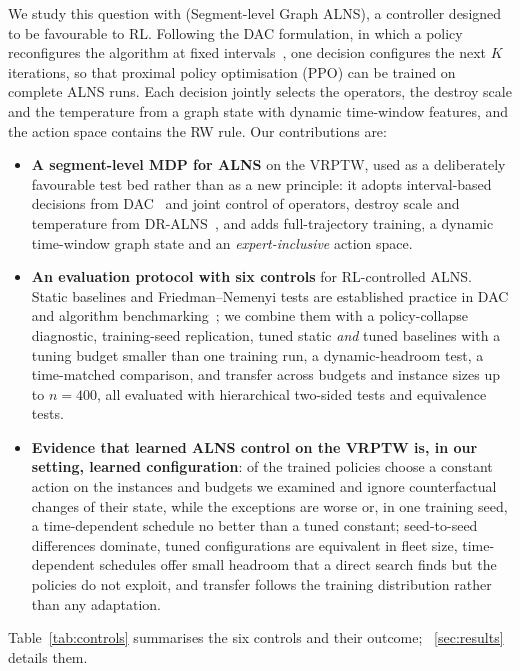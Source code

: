 We study this question with \sgalns{} (Segment-level Graph ALNS), a controller designed
to be favourable to RL. Following the DAC formulation, in which a policy
reconfigures the algorithm at fixed intervals~\cite{biedenkapp2020dac}, one decision
configures the next $K$ iterations, so that proximal policy optimisation (PPO) can be
trained on complete ALNS runs. Each decision jointly selects the operators, the destroy
scale and the temperature from a graph state with dynamic time-window features, and the
action space contains the RW rule. Our contributions are:
\begin{itemize}
\item \textbf{A segment-level MDP for ALNS} on the VRPTW, used as a deliberately
favourable test bed rather than as a new principle: it adopts interval-based decisions
from DAC~\cite{biedenkapp2020dac} and joint control of operators, destroy scale and
temperature from DR-ALNS~\cite{reijnen2024}, and adds full-trajectory training, a
dynamic time-window graph state and an \emph{expert-inclusive} action space.
\item \textbf{An evaluation protocol with six controls} for RL-controlled ALNS. Static
baselines and Friedman--Nemenyi tests are established practice in DAC and algorithm
benchmarking~\cite{eimer2021dacbench,demsar2006}; we combine them with a policy-collapse
diagnostic, training-seed replication, tuned static \emph{and} tuned \Rw{} baselines
with a tuning budget smaller than one training run, a dynamic-headroom test, a
time-matched comparison, and transfer across budgets and instance sizes up to $n=400$,
all evaluated with hierarchical two-sided tests and equivalence tests.
\item \textbf{Evidence that learned ALNS control on the VRPTW is, in our setting,
learned configuration}: \tCollapsed{} of the \tNpol{} trained policies choose a
constant action on the instances and budgets we examined and ignore counterfactual
changes of their state, while the exceptions are worse or, in one training seed, a
time-dependent schedule no better than a tuned constant; seed-to-seed differences dominate, tuned
configurations are equivalent in fleet size, time-dependent schedules offer small
headroom that a direct search finds but the policies do not exploit, and transfer
follows the training distribution rather than any adaptation.
\end{itemize}
Table~\ref{tab:controls} summarises the six controls and their outcome; \Sect~\ref{sec:results}
details them.
{\widetables
}
